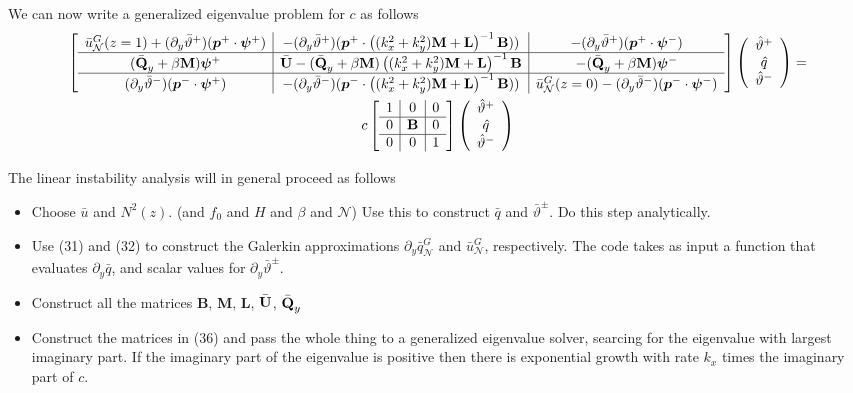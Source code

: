 \documentclass[10pt]{article}
\newcommand{\pd}[1]{\partial_{#1}}
\newcommand{\sN}{\mathcal{N}}
\newcommand{\mat}[1]{\text{\bf #1}}
\begin{document}
We can now write a generalized eigenvalue problem for $c$ as follows
\begin{multline}
\left[\begin{array}{c|c|c}
\bar{u}_\sN^G(z=1)+(\pd{y}\bar\vartheta^+)(\bm{p}^+\cdot\bm{\psi}^+)&-(\pd{y}\bar\vartheta^+)(\bm{p}^+\cdot\left((k_x^2+k_y^2)\mat{M}+\mat{L}\right)^{-1}\mat{B}))&-(\pd{y}\bar\vartheta^+)(\bm{p}^+\cdot\bm{\psi}^-)\\\hline
(\bar{\mat{Q}}_y+\beta\mat{M})\bm{\psi}^+&\bar{\mat{U}} -(\bar{\mat{Q}}_y+\beta\mat{M})\left((k_x^2+k_y^2)\mat{M}+\mat{L}\right)^{-1} \mat{B}&-(\bar{\mat{Q}}_y+\beta\mat{M})\bm{\psi}^-\\\hline
 (\pd{y}\bar\vartheta^-)(\bm{p}^-\cdot\bm{\psi}^+)&-(\pd{y}\bar\vartheta^-)(\bm{p}^-\cdot\left((k_x^2+k_y^2)\mat{M}+\mat{L}\right)^{-1}\mat{B}))&\bar{u}_\sN^G(z=0)-(\pd{y}\bar\vartheta^-)(\bm{p}^-\cdot\bm{\psi}^-)
\end{array}\right]\left(\begin{array}{c}\hat{\vartheta}^+\\\hat{q}\\\hat{\vartheta}^-\end{array}\right) = \\
c\left[\begin{array}{c|c|c}
1&0&0\\\hline
0&\mat{B}&0\\\hline
0&0&1
\end{array}\right]\left(\begin{array}{c}\hat{\vartheta}^+\\\hat{q}\\\hat{\vartheta}^-\end{array}\right)
\end{multline}

The linear instability analysis will in general proceed as follows
\begin{itemize}
\item Choose $\bar{u}$ and $N^2(z)$. (and $f_0$ and $H$ and $\beta$ and $\sN$) Use this to construct $\bar{q}$ and $\bar{\vartheta}^\pm$. Do this step analytically.
\item Use (31) and (32) to construct the Galerkin approximations $\pd{y}\bar q_\sN^G$ and $\bar u_\sN^G$, respectively. The code takes as input a function that evaluates $\pd{y}\bar{q}$, and scalar values for $\pd{y}\bar\vartheta^\pm$.
\item Construct all the matrices {\bf B}, {\bf M}, {\bf L}, $\bar{\mat{U}}$, $\bar{\mat{Q}}_y$
\item Construct the matrices in (36) and pass the whole thing to a generalized eigenvalue solver, searcing for the eigenvalue with largest imaginary part. If the imaginary part of the eigenvalue is positive then there is exponential growth with rate $k_x$ times the imaginary part of $c$.
\end{itemize}
\end{document}
